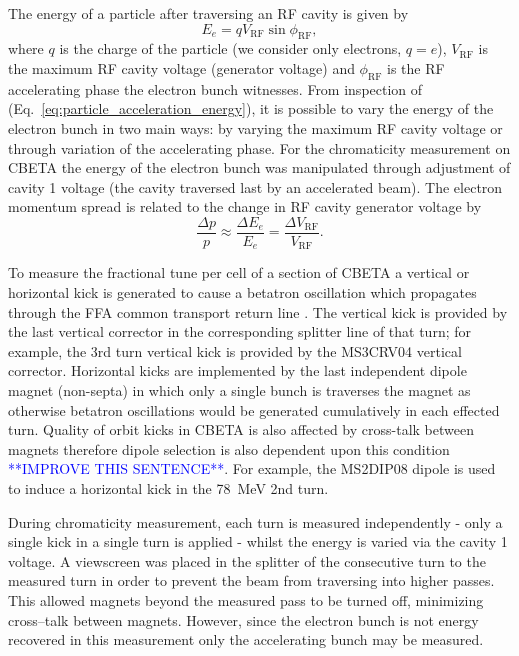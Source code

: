 \documentclass[../main.tex]{subfiles}
\begin{document}
The energy of a particle after traversing an RF cavity is given by
\begin{equation}
E_{e} = qV_{\mathrm{RF}}\sin\phi_{\mathrm{RF}},
\label{eq:particle_acceleration_energy}
\end{equation}
where $q$ is the charge of the particle (we consider only electrons, $q=e$), $V_{\mathrm{RF}}$ is the maximum RF cavity voltage (generator voltage) and $\phi_{\mathrm{RF}}$ is the RF accelerating phase the electron bunch witnesses. From inspection of (Eq.~\ref{eq:particle_acceleration_energy}), it is possible to vary the energy of the electron bunch in two main ways: by varying the maximum RF cavity voltage or through variation of the accelerating phase. For the chromaticity measurement on CBETA the energy of the electron bunch was manipulated through adjustment of cavity 1 voltage (the cavity traversed last by an accelerated beam). The electron momentum spread is related to the change in RF cavity generator voltage by
\begin{equation}
\frac{\Delta p}{p}\approx \frac{\Delta E_{e}}{E_{e}} = \frac{\Delta V_{\mathrm{RF}}}{V_{\mathrm{RF}}}.    
\end{equation}

To measure the fractional tune per cell of a section of CBETA a vertical or horizontal kick is generated to cause a betatron oscillation which propagates through the FFA common transport return line \cite{gulliford2021measurement}. The vertical kick is provided by the last vertical corrector in the corresponding splitter line of that turn; for example, the 3rd turn vertical kick is provided by the MS3CRV04 vertical corrector. Horizontal kicks are implemented by the last independent dipole magnet (non-septa) in which only a single bunch is traverses the magnet as otherwise betatron oscillations would be generated cumulatively in each effected turn. Quality of orbit kicks in CBETA is also affected by cross-talk between magnets therefore dipole selection is also dependent upon this condition \textcolor{blue}{**IMPROVE THIS SENTENCE**}. For example, the MS2DIP08 dipole is used to induce a horizontal kick in the 78~\si{\mega\electronvolt} 2nd turn.

During chromaticity measurement, each turn is measured independently - only a single kick in a single turn is applied - whilst the energy is varied via the cavity 1 voltage. A viewscreen was placed in the splitter of the consecutive turn to the measured turn in order to prevent the beam from traversing into higher passes. This allowed magnets beyond the measured pass to be turned off, minimizing cross--talk between magnets. However, since the electron bunch is not energy recovered in this measurement only the accelerating bunch may be measured.    
\end{document}
